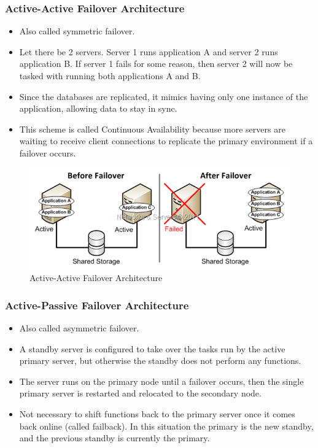 \documentclass{article}
\begin{document}
\subsubsection{Active-Active Failover Architecture}
\begin{itemize}
    \item Also called symmetric failover. 
    
    \item Let there be 2 servers. Server 1 runs application A and server 2 runs application B. If server 1 fails for some reason, then server 2 will now be tasked with running both applications A and B. 
    
    \item Since the databases are replicated, it mimics having only one instance of the application, allowing data to stay in sync.
    
    \item This scheme is called Continuous Availability because more servers are waiting to receive client connections to replicate the primary environment if a failover occurs.
\end{itemize}
\begin{figure}[!h]
    \centering
    \includegraphics[scale=0.6]{active-active.png}
    \caption{Active-Active Failover Architecture}
    \label{fig:my_label_69}
\end{figure}

\subsubsection{Active-Passive Failover Architecture}
\begin{itemize}
    \item Also called asymmetric failover.
    
    \item A standby server is configured to take over the tasks run by the active primary server, but otherwise the standby does not perform any functions. 
    
    \item The server runs on the primary node until a failover occurs, then the single primary server is restarted and relocated to the secondary node.
    
    \item Not necessary to shift functions back to the primary server once it comes back online (called failback). In this situation the primary is the new standby, and the previous standby is currently the primary. 
\end{itemize}
\end{document}

